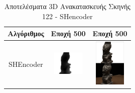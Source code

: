     \begin{table}[H]
    \centering
    \begin{tabular}{|c|c|c|}
    \hline
    Αλγόριθμος & Εποχή 500 & Εποχή 500 \\
    \hline
     SHEncoder & 
    \includegraphics[width=1.5cm]{images/chapter5_img/RenderedImages-DepthMaps-EpochWise-Evals/MRHashGrid3D/ShencoderHashGrid/depth_500.jpg} & 
    \includegraphics[width=1.5cm]{images/chapter5_img/RenderedImages-DepthMaps-EpochWise-Evals/MRHashGrid3D/ShencoderHashGrid/rendering_500.jpg} \\
    \hline
    \end{tabular}
    \caption{Αποτελέσματα 3D Ανακατασκευής Σκηνής 122 - SHencoder}
    \end{table}
    